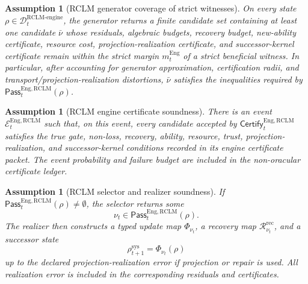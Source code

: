 \documentclass[11pt,a4paper]{article}
\newtheorem{assumption}[theorem]{Assumption}
\newcommand{\Ecal}{\mathcal E}
\newcommand{\Dcal}{\mathcal D}
\newcommand{\RCLM}{\mathrm{RCLM}}
\newcommand{\sys}{\mathrm{sys}}
\newcommand{\rec}{\mathrm{rec}}
\newcommand{\engine}{\mathrm{engine}}
\newcommand{\Eng}{\mathrm{Eng}}
\begin{document}
\begin{assumption}[RCLM generator coverage of strict witnesses]
\label{ass:rclm-generator-coverage-strict-witnesses}
On every state \(\rho\in\Dcal_t^{\RCLM\text{-}\engine}\), the generator returns a finite candidate set containing at least one candidate \(\bar\nu\) whose residuals, algebraic budgets, recovery budget, new-ability certificate, resource cost, projection-realization certificate, and successor-kernel certificate remain within the strict margin \(m_t^{\Eng}\) of a strict beneficial witness. In particular, after accounting for generator approximation, certification radii, and transport/projection-realization distortions, \(\bar\nu\) satisfies the inequalities required by \(\mathsf{Pass}_t^{\Eng,\RCLM}(\rho)\).
\end{assumption}

\begin{assumption}[RCLM engine certificate soundness]
\label{ass:rclm-engine-certificate-soundness}
There is an event \(\Ecal_t^{\Eng,\RCLM}\) such that, on this event, every candidate accepted by \(\mathsf{Certify}_t^{\Eng,\RCLM}\) satisfies the true gate, non-loss, recovery, ability, resource, trust, projection-realization, and successor-kernel conditions recorded in its engine certificate packet. The event probability and failure budget are included in the non-oracular certificate ledger.
\end{assumption}

\begin{assumption}[RCLM selector and realizer soundness]
\label{ass:rclm-selector-realizer-soundness}
If \(\mathsf{Pass}_t^{\Eng,\RCLM}(\rho)\neq\emptyset\), the selector returns some
\[
\nu_t\in\mathsf{Pass}_t^{\Eng,\RCLM}(\rho).
\]
The realizer then constructs a typed update map \(\Phi_{\nu_t}\), a recovery map \(\mathcal R_{\nu_t}^{\rec}\), and a successor state
\[
\rho_{t+1}^{\sys}=\Phi_{\nu_t}(\rho)
\]
up to the declared projection-realization error if projection or repair is used. All realization error is included in the corresponding residuals and certificates.
\end{assumption}
\end{document}
